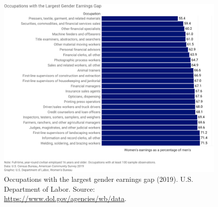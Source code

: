 \begin{figure}[t!]
\includegraphics[scale=.7]{figures/dol_occupations_with_largest_gender_earnings_gap.pdf}
\centering
\caption{Occupations with the largest gender earnings gap (2019).\newline
U.S. Department of Labor. Source: \upshape\protect\url{https://www.dol.gov/agencies/wb/data}.}
\label{fig:dol_occupations_with_largest_gender_earnings_gap}
\end{figure}
